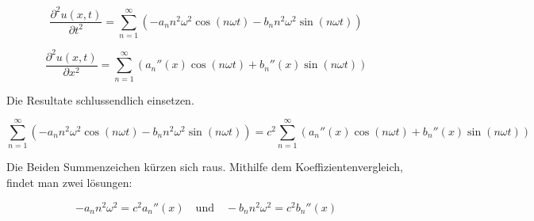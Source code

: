 \begin{equation}
	\frac{\partial^2 u(x,t)}{\partial t^2} = \sum_{n=1}^{\infty} \left( -a_n n^2 \omega^2 \cos(n \omega t) - b_n n^2 \omega^2 \sin(n \omega t) \right)
\end{equation}

\begin{equation}
	\frac{\partial^2 u(x,t)}{\partial x^2} = \sum_{n=1}^{\infty} \left( a_n''(x) \cos(n \omega t) + b_n''(x) \sin(n \omega t) \right)
\end{equation}

Die Resultate schlussendlich einsetzen.

\begin{equation}
	\sum_{n=1}^{\infty} \left( -a_n n^2 \omega^2 \cos(n \omega t) - b_n n^2 \omega^2 \sin(n \omega t) \right) = c^2 \sum_{n=1}^{\infty} \left( a_n''(x) \cos(n \omega t) + b_n''(x) \sin(n \omega t) \right)
\end{equation}

Die Beiden Summenzeichen kürzen sich raus. Mithilfe dem Koeffizientenvergleich, findet man zwei lösungen:

\begin{equation}
	-a_n n^2 \omega^2 = c^2 a_n''(x) \quad \text{und} \quad -b_n n^2 \omega^2 = c^2 b_n''(x)
\end{equation}


